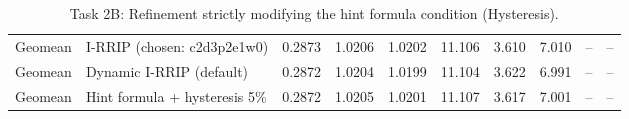 \begin{table}[H]
{\begin{tabular}{llrrrrrrrr}
Geomean & I-RRIP (chosen: c2d3p2e1w0) & 0.2873 & 1.0206 & 1.0202 & 11.106 & 3.610 & 7.010 & -- & -- \\
Geomean & Dynamic I-RRIP (default) & 0.2872 & 1.0204 & 1.0199 & 11.104 & 3.622 & 6.991 & -- & -- \\
Geomean & Hint formula + hysteresis 5\% & 0.2872 & 1.0205 & 1.0201 & 11.107 & 3.617 & 7.001 & -- & -- \\
\bottomrule
\end{tabular}}
\ifdim\wd\fitbx>\linewidth\resizebox{\linewidth}{!}{\usebox{\fitbx}}\else\usebox{\fitbx}\fi
\caption{Task 2B: Refinement strictly modifying the hint formula condition (Hysteresis).}\label{tab:t2b_hint}
\end{table}
